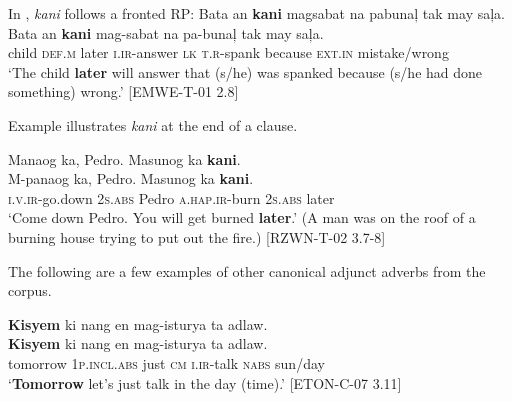 In , \textit{kani} follows a fronted RP:
\ea
\label{bkm:Ref481497209}
Bata  an  \textbf{kani}  magsabat  na  pabunaļ  tak  may  saļa. \\\smallskip
 \gll Bata  an  \textbf{kani}  mag-sabat  na  pa-bunaļ  tak  may  saļa. \\
child  \textsc{def.m}  later  \textsc{i.ir}-answer  \textsc{lk}  \textsc{t.r}-spank  because  \textsc{ext.in}  mistake/wrong \\
\glt ‘The child \textbf{later} will answer that (s/he) was spanked because (s/he had done something) wrong.’ [EMWE-T-01 2.8]
\z

Example  illustrates \textit{kani} at the end of a clause.

\ea
\label{bkm:Ref481496953}
Manaog  ka,  Pedro.  Masunog  ka  \textbf{kani}. \\\smallskip
 \gll M-panaog  ka,  Pedro.  Masunog  ka  \textbf{kani}. \\
\textsc{i.v.ir}-go.down  2\textsc{s.abs}  Pedro  \textsc{a.hap.ir}-burn  2\textsc{s.abs}  later \\
\glt ‘Come down Pedro. You will get burned \textbf{later}.’ (A man was on the roof of a burning house trying to put out the fire.) [RZWN-T-02 3.7-8]
\z

The following are a few examples of other canonical adjunct adverbs from the corpus.

\ea
\textbf{Kisyem}  ki  nang  en  mag-isturya  ta  adlaw. \\\smallskip
 \gll \textbf{Kisyem}  ki  nang  en  mag-isturya  ta  adlaw. \\
tomorrow  1\textsc{p.incl.abs}  just  \textsc{cm}  \textsc{i.ir}-talk  \textsc{nabs}  sun/day \\
\glt ‘\textbf{Tomorrow} let’s just talk in the day (time).’ [ETON-C-07 3.11]
\z


